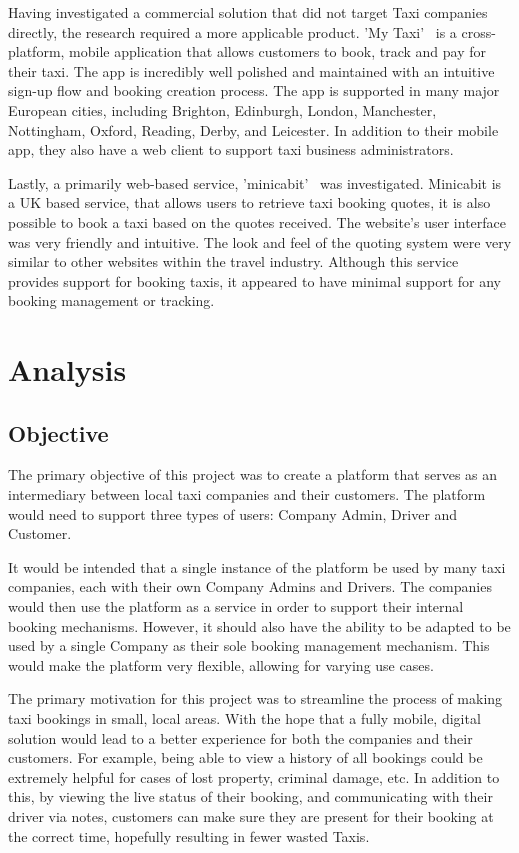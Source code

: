 Having investigated a commercial solution that did not target Taxi companies directly, the research required a more applicable product. 'My Taxi'~\cite{mytaxi_documentation_ref} is a cross-platform, mobile application that allows customers to book, track and pay for their taxi. The app is incredibly well polished and maintained with an intuitive sign-up flow and booking creation process. The app is supported in many major European cities, including Brighton, Edinburgh, London, Manchester, Nottingham, Oxford, Reading, Derby, and Leicester. In addition to their mobile app, they also have a web client to support taxi business administrators.

Lastly, a primarily web-based service, 'minicabit'~\cite{minicabit_documentation_ref} was investigated. Minicabit is a UK based service, that allows users to retrieve taxi booking quotes, it is also possible to book a taxi based on the quotes received. The website's user interface was very friendly and intuitive. The look and feel of the quoting system were very similar to other websites within the travel industry. Although this service provides support for booking taxis, it appeared to have minimal support for any booking management or tracking.

\section{Analysis}
\subsection{Objective}\label{ref_objectives}
The primary objective of this project was to create a platform that serves as an intermediary between local taxi companies and their customers. The platform would need to support three types of users: Company Admin, Driver and Customer. 

It would be intended that a single instance of the platform be used by many taxi companies, each with their own Company Admins and Drivers. The companies would then use the platform as a service in order to support their internal booking mechanisms. However, it should also have the ability to be adapted to be used by a single Company as their sole booking management mechanism. This would make the platform very flexible, allowing for varying use cases.

The primary motivation for this project was to streamline the process of making taxi bookings in small, local areas. With the hope that a fully mobile, digital solution would lead to a better experience for both the companies and their customers. For example, being able to view a history of all bookings could be extremely helpful for cases of lost property, criminal damage, etc. In addition to this, by viewing the live status of their booking, and communicating with their driver via notes, customers can make sure they are present for their booking at the correct time, hopefully resulting in fewer wasted Taxis.

